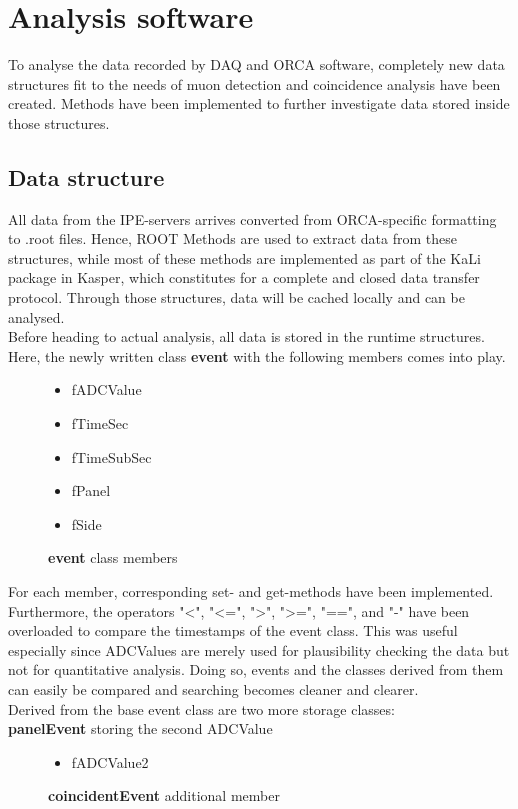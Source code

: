 
\chapter{Analysis software}
\label{ch:Analysis software}
  To analyse the data recorded by DAQ and ORCA software, completely new data structures fit to the needs of muon detection and coincidence analysis have been created. 
  Methods have been implemented to further investigate data stored inside those structures.
  \section{Data structure}
  \label{ch:Analysis software:sec:Data structure}
    All data from the IPE-servers arrives converted from ORCA-specific formatting to .root files. Hence, ROOT Methods are used to extract data from these structures, while most of these methods are implemented as part of the KaLi package in Kasper, which constitutes for a complete and closed data transfer protocol.
    Through those structures, data will be cached locally and can be analysed.\\
    Before heading to actual analysis, all data is stored in the runtime structures.
    Here, the newly written class {\bf event} with the following members comes into play.
    \begin{figure}
      \caption*{{\bf event} class members}
      \begin{itemize}
	\item fADCValue
    	\item fTimeSec
    	\item fTimeSubSec
    	\item fPanel
    	\item fSide
      \end{itemize}
    \end{figure}
    For each member, corresponding set- and get-methods have been implemented. Furthermore, the operators "<", "<=", ">", ">=", "==", and "-" have been overloaded to compare the timestamps of the event class. This was useful especially since ADCValues are merely used for plausibility checking the data but not for quantitative analysis. Doing so, events and the classes derived from them can easily be compared and searching becomes cleaner and clearer.\\
    Derived from the base event class are two more storage classes:\\
    {\bf panelEvent} storing the second ADCValue
    \begin{figure}
      \caption*{{\bf coincidentEvent} additional member}
      \begin{itemize}
	\item fADCValue2
      \end{itemize}
    \end{figure}
	
